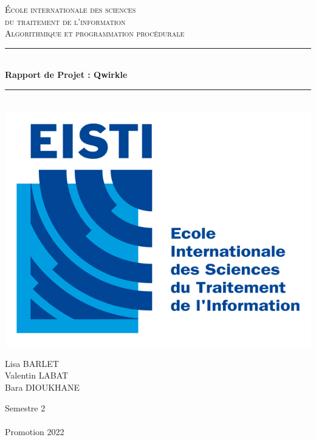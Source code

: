 \documentclass[a4paper, 11pt, openany]{report} %
\date{Novembre 2017}
\title{\titre}
\author{\auteur}
\newcommand{\HRule}{\rule{\linewidth}{0.5mm}}
\begin{document}
\begin{titlepage}
  \begin{sffamily}
  \begin{center}

    \textsc{\LARGE École internationale des sciences \\ du traitement de l'information}\\[4cm]

    \textsc{\huge {\selectfont Algorithmique et programmation procédurale}}\\[1.5cm]
    

    \HRule \\[0.6cm]
    {\huge \bfseries Rapport de Projet : Qwirkle}
    

    \HRule \\[2cm]
    \includegraphics[scale=0.3]{Images/LogoEISTI.jpg}
    \\[2,10 cm]
    
    \begin{minipage}{0.4\textwidth}
      \begin{flushleft} \large
        Lisa \textsc{BARLET}\\
        Valentin \textsc{LABAT}\\
        Bara \textsc{DIOUKHANE}\\ 
      
      \end{flushleft}
    \end{minipage}
    \begin{minipage}{0.5\textwidth}
      \begin{flushright} \large
        Semestre 2 \\\\[0,20 cm]
        Promotion 2022\\
      \end{flushright}
    \end{minipage}
    \\[1,58 cm]
    

\end{center}
\end{sffamily}
\end{titlepage}
\end{document}
